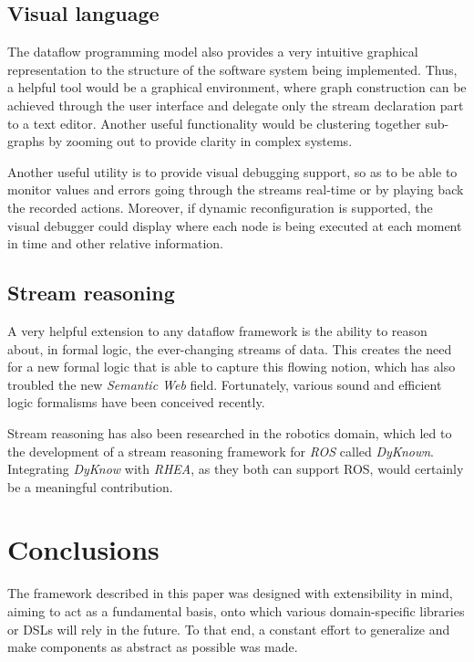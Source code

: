 \documentclass[sigplan,review,anonymous]{acmart}\settopmatter{printfolios=true}
\begin{document}
\subsection{Visual language}

The dataflow programming model also provides a very intuitive graphical representation to the structure of the software system being implemented. Thus, a helpful tool would be a graphical environment, where graph construction can be achieved through the user interface and delegate only the stream declaration part to a text editor. Another useful functionality would be clustering together sub-graphs by zooming out to provide clarity in complex systems.

Another useful utility is to provide visual debugging support, so as to be able to monitor values and errors going through the streams real-time or by playing back the recorded actions. Moreover, if dynamic reconfiguration is supported, the visual debugger could display where each node is being executed at each moment in time and other relative information.

\subsection{Stream reasoning}	

A very helpful extension to any dataflow framework is the ability to reason about, in formal logic, the ever-changing streams of data. This creates the need for a new formal logic that is able to capture this flowing notion, which has also troubled the new \textit{Semantic Web} field\cite{streaming_world}. Fortunately, various sound and efficient logic formalisms have been conceived recently\cite{pdt_logic,asp}.

Stream reasoning has also been researched in the robotics domain\cite{robot_reasoning}, which led to the development of a stream reasoning framework for \textit{ROS} called \textit{DyKnown}\cite{stream_reasoning}. Integrating \textit{DyKnow} with \textit{RHEA}, as they both can support ROS, would certainly be a meaningful contribution.

\section{Conclusions}

The framework described in this paper was designed with extensibility in mind, aiming to act as a fundamental basis, onto which various domain-specific libraries or DSLs will rely in the future. To that end, a constant effort to generalize and make components as abstract as possible was made. 
\end{document}
